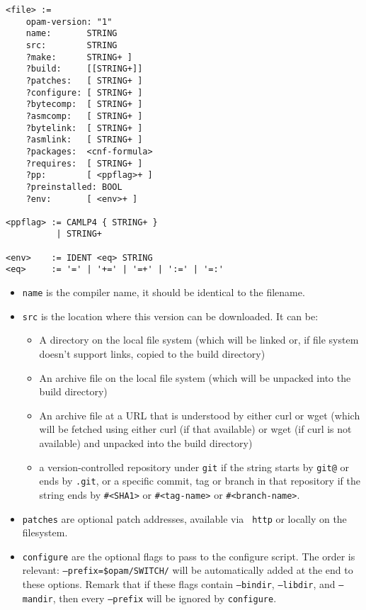 \documentclass[a4paper,11pt]{article}
\begin{document}
{
\begin{Verbatim}[frame=single]
<file> :=
    opam-version: "1"
    name:       STRING
    src:        STRING
    ?make:      STRING+ ]
    ?build:     [[STRING+]]
    ?patches:   [ STRING+ ]
    ?configure: [ STRING+ ]
    ?bytecomp:  [ STRING+ ]
    ?asmcomp:   [ STRING+ ]
    ?bytelink:  [ STRING+ ]
    ?asmlink:   [ STRING+ ]
    ?packages:  <cnf-formula>
    ?requires:  [ STRING+ ]
    ?pp:        [ <ppflag>+ ]
    ?preinstalled: BOOL
    ?env:       [ <env>+ ]

<ppflag> := CAMLP4 { STRING+ }
          | STRING+

<env>    := IDENT <eq> STRING
<eq>     := '=' | '+=' | '=+' | ':=' | '=:'
\end{Verbatim}
}
\begin{itemize}

\item {\tt name} is the compiler name, it should be identical to the filename.
\item {\tt src} is the location where this version can be downloaded. It can be:
\begin{itemize}
\item A directory on the local file system (which will be linked or,
  if file system doesn't support links, copied to the build directory)
\item An archive file on the local file system (which will be unpacked
  into the build directory)
\item An archive file at a URL that is understood by either curl or
  wget (which will be fetched using either curl (if that available) or
  wget (if curl is not available) and unpacked into the build
  directory)
\item a version-controlled repository under {\tt git} if the string
  starts by {\tt git@} or ends by {\tt .git}, or a specific commit,
  tag or branch in that repository if the string ends by \verb+#<SHA1>+
  or \verb+#<tag-name>+ or \verb+#<branch-name>+.
\end{itemize}

\item {\tt patches} are optional patch addresses, available via {\tt
  http} or locally on the filesystem.

\item {\tt configure} are the optional flags to pass to the configure
  script. The order is relevant: {\tt --prefix=\$opam/SWITCH/} will be automatically
  added at the end to these options.
  Remark that if these flags contain {\tt --bindir}, {\tt --libdir},
  and {\tt --mandir}, then every {\tt --prefix} will be ignored by {\tt configure}.


\end{itemize}
\end{document}
